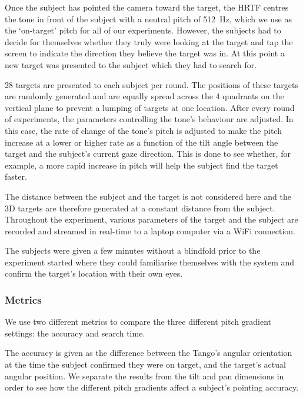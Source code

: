 \documentclass[format=sigconf, review=true, screen=true, anonymous=true]{acmart}
\begin{document}
Once the subject has pointed the camera toward the target, the HRTF centres the tone in front of the subject with a neutral pitch of \SI{512}{\hertz}, which we use as the `on-target' pitch for all of our experiments.  However, the subjects had to decide for themselves whether they truly were looking at the target and tap the screen to indicate the direction they believe the target was in. At this point a new target was presented to the subject which they had to search for. 

28 targets are presented to each subject per round. The positions of these targets are randomly generated and are equally spread across the 4 quadrants on the vertical plane to prevent a lumping of targets at one location. After every round of experiments, the parameters controlling the tone's behaviour are adjusted. In this case, the rate of change of the tone's pitch is adjusted to make the pitch increase at a lower or higher rate as a function of the tilt angle between the target and the subject's current gaze direction. This is done to see whether, for example, a more rapid increase in pitch will help the subject find the target faster. 

The distance between the subject and the target is not considered here and the 3D targets are therefore generated at a constant distance from the subject. Throughout the experiment, various parameters of the target and the subject are recorded and streamed in real-time to a laptop computer via a WiFi connection.

The subjects were given a few minutes without a blindfold prior to the experiment started where they could familiarise themselves with the system and confirm the target's location with their own eyes.

\subsubsection{Metrics}

We use two different metrics to compare the three different pitch gradient settings: the accuracy and search time. 

The accuracy is given as the difference between the Tango's angular orientation at the time the subject confirmed they were on target, and the target's actual angular position. We separate the results from the tilt and pan dimensions in order to see how the different pitch gradients affect a subject's pointing accuracy. 
\end{document}
